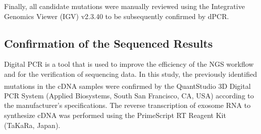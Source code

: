 Finally, all candidate mutations were manually reviewed using the Integrative Genomics Viewer (IGV) v2.3.40 to be subsequently confirmed by dPCR.

\subsection{Confirmation of the Sequenced Results}

Digital PCR is a tool that is used to improve the efficiency of the NGS workflow and for the verification of sequencing data. In this study, the previously identified mutations in the cDNA samples were confirmed by the QuantStudio\textsuperscript\textregistered{} 3D Digital PCR System (Applied Biosystems, South San Francisco, CA, USA) according to the manufacturer's specifications. The reverse transcription of exosome RNA to synthesize cDNA was performed using the PrimeScript\texttrademark{} RT Reagent Kit (TaKaRa, Japan).

